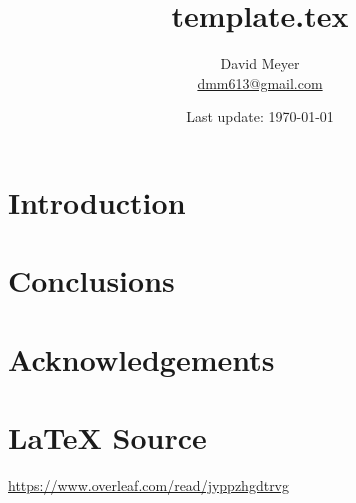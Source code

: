 \documentclass{article}
\title{template.tex}
\author{David Meyer \\ \href{mailto:dmm613@gmail.com}{dmm613@gmail.com}}
\date{Last update: \today}
\theoremstyle{definition}
\begin{document}
\maketitle
%
%
%
\section{Introduction}
%
%
%
%
%
%
%
%
\section{Conclusions}
%
%
%
\section*{Acknowledgements}
%
%
\section*{\LaTeX \hspace{0.10 mm} Source}
\url{https://www.overleaf.com/read/jyppzhgdtrvg}
%
%
%


%
%
\end{document}
